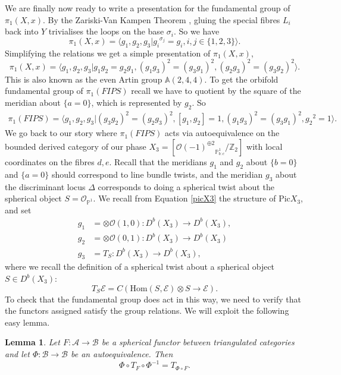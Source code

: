 \documentclass[oneside,reqno]{amsart}
\newtheorem{lemma}{Lemma} [section]
\theoremstyle{definition}
\theoremstyle{definition}
\theoremstyle{definition}
\theoremstyle{definition}
\newcommand{\PP}{\mathbb{P}}
\newcommand{\A}{\mathbb{A}}
\newcommand{\Z}{\mathbb{Z}}
\newcommand{\Os}{\mathcal{O}}
\newcommand{\Es}{\mathcal{E}}
\begin{document}
We are finally now ready to write a presentation for the fundamental group of $\pi_1(X,x)$. By the Zariski-Van Kampen Theorem \cite[Theorem 2.6 ]{cogolludo}, gluing the special fibres $L_i$ back into $Y$ trivialises the loops on the base $\sigma_i$. So we have 
$$
\pi_1(X,x) = \langle g_1, g_2, g_3 | {g_i}^{\sigma_j}=g_i, i,j \in \{1,2,3\} \rangle.
$$
Simplifying the relations we get a simple presentation of $\pi_1(X,x)$,
$$
\pi_1(X,x) = \langle g_1, g_2, g_3 | g_1g_2=g_2 g_1, (g_1 g_3)^2 = (g_3 g_1)^2 , (g_2g_3)^2= (g_3g_2)^2\rangle.
$$
This is also known as the even Artin group $\A (2,4,4)$. To get the orbifold fundamental group of $\pi_1(FIPS)$ recall we have to quotient by the square of the meridian about $\{ a=0\}$, which is represented by $g_2$. So 
\begin{align}
\pi_1(FIPS) = \langle g_1, g_2, g_3 |(g_3g_2)^2 = (g_2g_3)^2, [g_1,g_2]=1, (g_1 g_3)^2 = (g_3 g_1)^2 , {g_2}^2 =1\rangle.
\label{fipspresentation}
\end{align}
We go back to our story where $\pi_1(FIPS)$ acts via autoequivalence on the bounded derived category of our phase $X_3 = \left[{\mathcal{O}(-1)^{\oplus 2}}_{\PP^1_{b:c}} / \Z_2 \right]$ with local coordinates on the fibres $d,e$. Recall that the meridians $ g_1$ and $g_2$ about $\{b=0 \}$ and $\{a=0 \}$ should correspond to line bundle twists, and the meridian $ g_3 $ about the discriminant locus $\Delta$ corresponds to doing a spherical twist about the spherical object $S=\Os_{\PP^1}$. We recall from Equation \eqref{picX3} the structure of $\text{Pic}X_3$, and set
\begin{align*}
    g_1 &= \otimes \Os(1,0) : D^b(X_3) \to D^b(X_3),\\
    g_2 &= \otimes \Os(0,1) : D^b(X_3) \to D^b(X_3)\\
    g_3 &= T_{S}: D^b(X_3) \to D^b(X_3),
\end{align*}
where we recall the definition of a spherical twist about a spherical object $S \in D^b(X_3)$:
\begin{equation*}
     T_{S}\Es =C\left(\text{Hom}(S,\Es )\otimes S \to \Es  \right).
\end{equation*}
To check that the fundamental group does act in this way, we need to verify that the functors assigned satisfy the group relations. We will exploit the following easy lemma.
\begin{lemma}
    \label{twistrels}
    Let $F : \mathcal{A} \to \mathcal{B}$ be a spherical functor between triangulated categories and let $\Phi : \mathcal{B} \to \mathcal{B}$ be an autoequivalence. Then
    $$
    \Phi \circ T_F \circ  \Phi^{-1} = T_{\Phi \circ F}.
    $$
\end{lemma}
\end{document}
